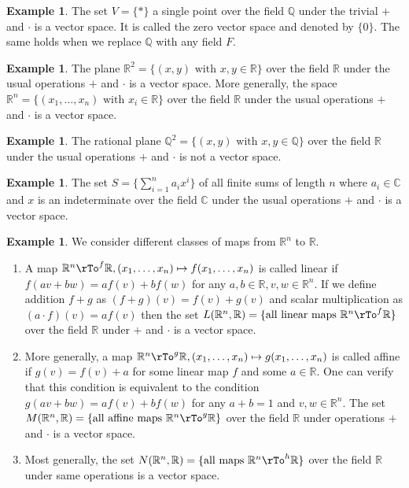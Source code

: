 \documentclass[12pt]{amsart}
\theoremstyle{definition}
\newtheorem{example}[theorem]{Example}
\begin{document}
\begin{example} The set $V = \{\ast\}$ a single point over the field $\mathbb{Q}$ under the trivial $+$ and $\cdot$ is a vector space. It is called the zero vector space and denoted by $\{0\}$. The same holds when we replace $\mathbb{Q}$ with any field $F$.
\end{example}

\begin{example} The plane $\mathbb{R}^2 = \{(x, y) \text{ with } x, y \in \mathbb{R}\}$ over the field $\mathbb{R}$ under the usual operations $+$ and $\cdot$ is a vector space. More generally, the space $\mathbb{R}^n = \{(x_1, \dots ,  x_n) \text{ with } x_i \in \mathbb{R}\}$ over the field $\mathbb{R}$ under the usual operations $+$ and $\cdot$ is a vector space.
\end{example}

\begin{example}\label{} The rational plane $\mathbb{Q}^2 = \{(x, y) \text{ with } x, y \in \mathbb{Q}\}$ over the field $\mathbb{R}$ under the usual operations $+$ and $\cdot$ is not a vector space.
\end{example}

\begin{example}\label{finitesum} The set $S = \{ \sum\limits_{i=1}^{n}a_ix^i \}$ of all finite sums of length $n$ where $a_i \in \mathbb{C}$ and $x$ is an indeterminate over the field $\mathbb{C}$ under the usual operations $+$ and $\cdot$ is a vector space.
\end{example}

\begin{example}\label{mapsfromR^ntoR} We consider different classes of maps from $\mathbb{R}^n$ to $\mathbb{R}$.
\begin{enumerate}[\indent a.]
\item A map $\mathbb{R}^n \rTo^f \mathbb{R}, (x_1, \dots , x_n) \mapsto f(x_1, \dots , x_n)$ is called linear if $f(a v + b w) = a f(v) + b f(w)$ for any $a, b \in \mathbb{R}, v, w \in \mathbb{R}^n$. If we define addition $f+g$ as $(f + g)(v) = f(v) + g(v)$ and scalar multiplication as $(a \cdot f)(v) = a f(v)$ then the set $L(\mathbb{R}^n, \mathbb{R}) = \{\text{all linear maps } \mathbb{R}^n \rTo^{f} \mathbb{R}\}$ over the field $\mathbb{R}$ under $+$ and $\cdot$ is a vector space.
\item More generally, a map $\mathbb{R}^n \rTo^g \mathbb{R}, (x_1, \dots , x_n) \mapsto g(x_1, \dots , x_n)$ is called affine if $g(v) = f(v) + a$ for some linear map $f$ and some $a \in \mathbb{R}$. One can verify that this condition is equivalent to the condition $g(a v + b w) = a f(v) + b f(w)$ for any $a + b = 1$ and $v, w \in \mathbb{R}^n$. The set $M(\mathbb{R}^n, \mathbb{R}) = \{\text{all affine maps }\mathbb{R}^n \rTo^{g} \mathbb{R}\}$ over the field $\mathbb{R}$ under operations $+$ and $\cdot$ is a vector space.
\item Most generally, the set $N(\mathbb{R}^n, \mathbb{R}) = \{\text{all maps }\mathbb{R}^n \rTo^{h} \mathbb{R}\}$ over the field $\mathbb{R}$ under same operations is a vector space.
\end{enumerate}
\end{example}
\end{document}
